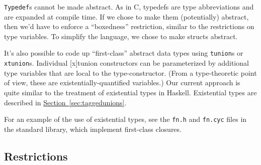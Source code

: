 \texttt{Typedef}s cannot be made abstract.  As in C, typedefs are type
abbreviations and are expanded at compile time.  If we chose to make
them (potentially) abstract, then we'd have to enforce a ``boxedness''
restriction, similar to the restrictions on type variables.  To
simplify the language, we chose to make structs abstract.

It's also possible to code up ``first-class'' abstract data types
using \texttt{tunion}s or \texttt{xtunion}s.  Individual [x]tunion
constructors can be parameterized by additional type variables that
are local to the type-constructor.  (From a type-theoretic point of
view, these are existentially-quantified variables.)  Our current
approach is quite similar to the treatment of existential types in
Haskell.  Existential types are described in
\hyperref[{sec:taggedunions}]{Section~\ref{sec:taggedunions}}.

For an example of the use of existential types, see the \texttt{fn.h}
and \texttt{fn.cyc} files in the standard library, which implement
first-class closures.

\subsection{Restrictions}

